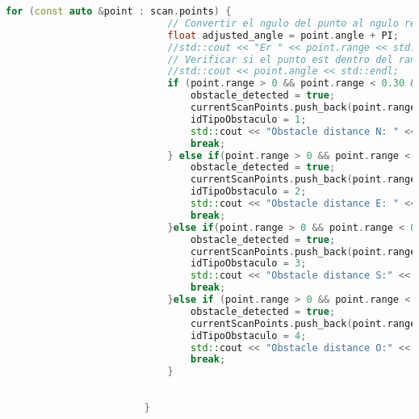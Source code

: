 \begin{lstlisting}[language={C++}, caption={Primer ajuste de c\'odigo}, label={Script}]
                        for (const auto &point : scan.points) {
                            // Convertir el ngulo del punto al ngulo relativo al "sur" del robot
                            float adjusted_angle = point.angle + PI;
                            //std::cout << "Er " << point.range << std::endl;
                            // Verificar si el punto est dentro del rango frontal de 30
                            //std::cout << point.angle << std::endl;
                            if (point.range > 0 && point.range < 0.30 && ( point.angle <= -0.5235f  && point.angle >= -2.617f)) { // Norte
                                obstacle_detected = true;
                                currentScanPoints.push_back(point.range);
                                idTipoObstaculo = 1;
                                std::cout << "Obstacle distance N: " << (float)point.range  << " Y en el angulo  "<<point.angle << std::endl;
                                break;
                            } else if(point.range > 0 && point.range < 0.25 && (point.angle <= 0.872f  && point.angle>= -0.5235f)){ // Este
                                obstacle_detected = true;
                                currentScanPoints.push_back(point.range);
                                idTipoObstaculo = 2;
                                std::cout << "Obstacle distance E: " << (float)point.range  << " Y en el angulo  "<<point.angle << std::endl;
                                break;
                            }else if(point.range > 0 && point.range < 0.45 && (point.angle <= 2.26f && point.angle >= 0.872f)){ // Sur
                                obstacle_detected = true;
                                currentScanPoints.push_back(point.range);
                                idTipoObstaculo = 3;
                                std::cout << "Obstacle distance S:" << (float)point.range  << " Y en el angulo  "<<point.angle << std::endl;
                                break;
                            }else if (point.range > 0 && point.range < 0.25 && (point.angle <= -2.61f  || point.angle >= 2.27f)){ // Oeste
                                obstacle_detected = true;
                                currentScanPoints.push_back(point.range);
                                idTipoObstaculo = 4;
                                std::cout << "Obstacle distance O:" << (float)point.range  << " Y en el angulo  "<<point.angle << std::endl;
                                break;
                            }
                            
                            
                        }
                        

\end{lstlisting}

